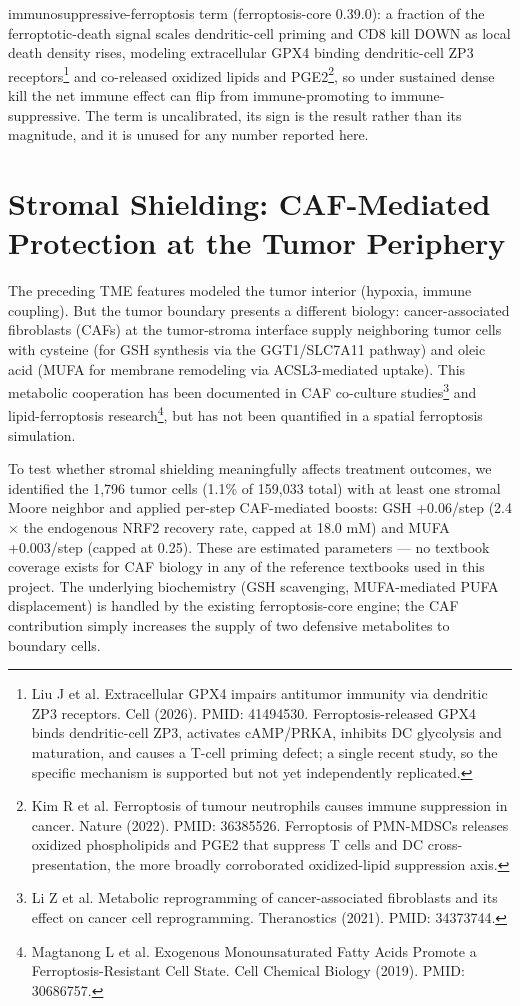 \documentclass[11pt,twoside,openright]{report}
\begin{document}
immunosuppressive-ferroptosis term (ferroptosis-core 0.39.0): a fraction of the ferroptotic-death signal scales dendritic-cell priming and CD8 kill DOWN as local death density rises, modeling extracellular GPX4 binding dendritic-cell ZP3 receptors\footnote{Liu J et al. Extracellular GPX4 impairs antitumor immunity via dendritic ZP3 receptors. Cell (2026). PMID: 41494530. Ferroptosis-released GPX4 binds dendritic-cell ZP3, activates cAMP/PRKA, inhibits DC glycolysis and maturation, and causes a T-cell priming defect; a single recent study, so the specific mechanism is supported but not yet independently replicated.} and co-released oxidized lipids and PGE2\footnote{Kim R et al. Ferroptosis of tumour neutrophils causes immune suppression in cancer. Nature (2022). PMID: 36385526. Ferroptosis of PMN-MDSCs releases oxidized phospholipids and PGE2 that suppress T cells and DC cross-presentation, the more broadly corroborated oxidized-lipid suppression axis.}, so under sustained dense kill the net immune effect can flip from immune-promoting to immune-suppressive. The term is uncalibrated, its sign is the result rather than its magnitude, and it is unused for any number reported here.

\section{Stromal Shielding: CAF-Mediated Protection at the Tumor Periphery}

The preceding TME features modeled the tumor interior (hypoxia, immune coupling). But the tumor boundary presents a different biology: cancer-associated fibroblasts (CAFs) at the tumor-stroma interface supply neighboring tumor cells with cysteine (for GSH synthesis via the GGT1/SLC7A11 pathway) and oleic acid (MUFA for membrane remodeling via ACSL3-mediated uptake). This metabolic cooperation has been documented in CAF co-culture studies\footnote{Li Z et al. Metabolic reprogramming of cancer-associated fibroblasts and its effect on cancer cell reprogramming. Theranostics (2021). PMID: 34373744.} and lipid-ferroptosis research\footnote{Magtanong L et al. Exogenous Monounsaturated Fatty Acids Promote a Ferroptosis-Resistant Cell State. Cell Chemical Biology (2019). PMID: 30686757.}, but has not been quantified in a spatial ferroptosis simulation.

To test whether stromal shielding meaningfully affects treatment outcomes, we identified the 1,796 tumor cells (1.1\% of 159,033 total) with at least one stromal Moore neighbor and applied per-step CAF-mediated boosts: GSH +0.06/step (2.4$\times$ the endogenous NRF2 recovery rate, capped at 18.0 mM) and MUFA +0.003/step (capped at 0.25). These are estimated parameters --- no textbook coverage exists for CAF biology in any of the reference textbooks used in this project. The underlying biochemistry (GSH scavenging, MUFA-mediated PUFA displacement) is handled by the existing ferroptosis-core engine; the CAF contribution simply increases the supply of two defensive metabolites to boundary cells.
\end{document}
